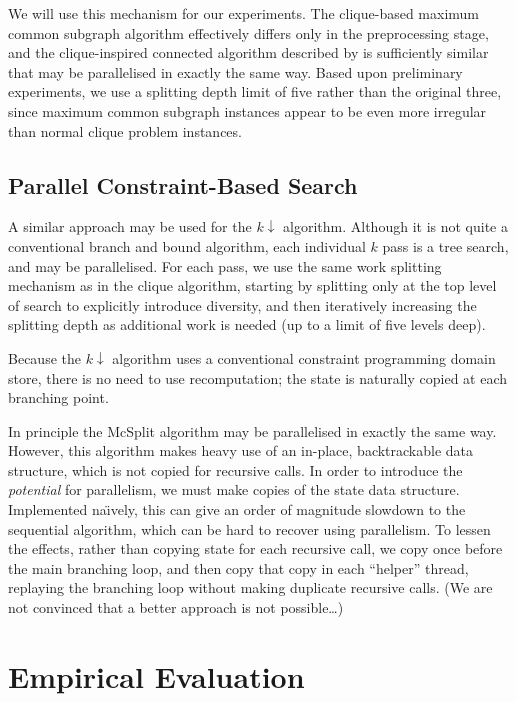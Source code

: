 \documentclass[sigconf]{acmart}
\begin{document}
We will use this mechanism for our experiments.  The clique-based maximum common subgraph algorithm
effectively differs only in the preprocessing stage, and the clique-inspired connected algorithm
described by \citet{DBLP:conf/cp/McCreeshNPS16} is sufficiently similar that may be parallelised in
exactly the same way. Based upon preliminary experiments, we use a splitting depth limit of five
rather than the original three, since maximum common subgraph instances appear to be even more
irregular than normal clique problem instances.

\subsection{Parallel Constraint-Based Search}

A similar approach may be used for the $k{\downarrow}$ algorithm. Although it is not quite a
conventional branch and bound algorithm, each individual $k$ pass is a tree search, and may be
parallelised. For each pass, we use the same work splitting mechanism as in the clique algorithm,
starting by splitting only at the top level of search to explicitly introduce diversity, and then
iteratively increasing the splitting depth as additional work is needed (up to a limit of five
levels deep).

Because the $k{\downarrow}$ algorithm uses a conventional constraint programming domain store, there
is no need to use recomputation; the state is naturally copied at each branching point.

In principle the McSplit algorithm may be parallelised in exactly the same way. However, this
algorithm makes heavy use of an in-place, backtrackable data structure, which is not copied for
recursive calls. In order to introduce the \emph{potential} for parallelism, we must make
copies of the state data structure. Implemented na{\"\i}vely, this can give an order of magnitude
slowdown to the sequential algorithm, which can be hard to recover using parallelism. To lessen the
effects, rather than copying state for each recursive call, we copy once before the main branching
loop, and then copy that copy in each ``helper'' thread, replaying the branching loop without making
duplicate recursive calls.  (We are not convinced that a better approach is not possible\ldots)

\section{Empirical Evaluation}
\end{document}
